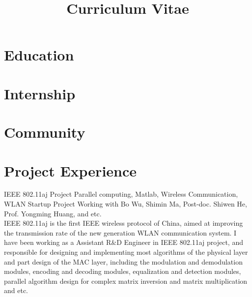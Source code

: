 \documentclass[11pt,a4paper]{moderncv}
\title{Curriculum Vitae}
\begin{document}
\maketitle

\section{Education}


\section{Internship}

\section{Community}

\section{Project Experience}

{IEEE 802.11aj Project}
{Parallel computing, Matlab, Wireless Communication, WLAN}
{Startup Project}{}
{Working with Bo Wu, Shimin Ma, Post-doc. Shiwen He, Prof. Yongming Huang, and etc. \\
IEEE 802.11aj is the first IEEE wireless protocol of China, aimed at improving the transmission rate of the new generation WLAN communication
system. I have been working as a Assistant R\&D Engineer in IEEE 802.11aj project, and responsible for designing and implementing most algorithms of the physical layer and part design of the MAC layer, including the modulation and demodulation modules, encoding and decoding modules, equalization and detection modules, parallel algorithm design for complex matrix inversion and matrix multiplication and etc.
}
\end{document}

